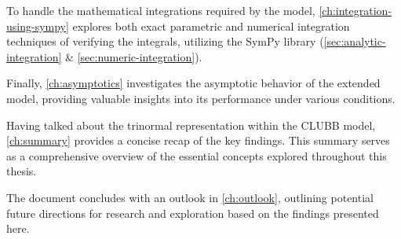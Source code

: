 To handle the mathematical integrations required by the model,
\cref{ch:integration-using-sympy} explores both exact parametric
and numerical integration techniques of verifying the integrals,
utilizing the SymPy library (\cref{sec:analytic-integration} \& \cref{sec:numeric-integration}).

Finally,
\cref{ch:asymptotics} investigates the asymptotic behavior of the extended model,
providing valuable insights into its performance under various conditions.

Having talked about the trinormal representation within the \gls{CLUBB} model,
\cref{ch:summary} provides a concise recap of the key findings.
This summary serves as a comprehensive overview of the essential concepts
explored throughout this thesis.

The document concludes with an outlook in \cref{ch:outlook},
outlining potential future directions for research
and exploration based on the findings presented here.
